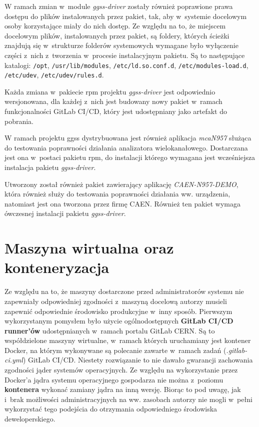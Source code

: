 W ramach zmian w~module \textit{ggss-driver} zostały również poprawione prawa dostępu do plików instalowanych przez pakiet, tak, aby w~systemie docelowym osoby korzystające miały do nich dostęp. 
Ze względu na to, że miejscem docelowym plików, instalowanych przez pakiet, są foldery, których ścieżki znajdują się w~strukturze folderów systemowych wymagane było wyłączenie części z~nich z~tworzenia w~procesie instalacyjnym pakietu. Są to następujące katalogi: \lstinline{/opt}, \lstinline{/usr/lib/modules}, \lstinline{/etc/ld.so.conf.d}, \lstinline{/etc/modules-load.d}, \lstinline{/etc/udev}, \lstinline{/etc/udev/rules.d}.

Każda zmiana w~pakiecie \gls*{rpm} projektu \textit{ggss-driver} jest odpowiednio wersjonowana, dla każdej z~nich jest budowany nowy pakiet w~ramach funkcjonalności GitLab CI/CD, który jest udostępniany jako artefakt do pobrania.

W ramach projektu \gls*{ggss} dystrybuowana jest również aplikacja \textit{mcaN957} służąca do testowania poprawności działania analizatora wielokanałowego. Dostarczana jest ona w~postaci pakietu \gls*{rpm}, do instalacji którego wymagana jest wcześniejsza instalacja pakietu \textit{ggss-driver}.

Utworzony został również pakiet zawierający aplikację \textit{CAEN-N957-DEMO}, która również służy do testowania poprawności działania ww. urządzenia, natomiast jest ona tworzona przez firmę CAEN. Również ten pakiet wymaga ówczesnej instalacji pakietu \textit{ggss-driver}.


\newpage
\section{Maszyna wirtualna oraz konteneryzacja}
\label{sec:wirtDocker}

Ze względu na to, że maszyny dostarczone przed administratorów systemu nie zapewniały odpowiedniej zgodności z~maszyną docelową autorzy musieli zapewnić odpowiednie środowisko produkcyjne w~inny sposób. Pierwszym wykorzystanym pomysłem było użycie ogólnodostępnych \textbf{GitLab CI/CD runner'ów} udostępnianych w~ramach portalu GitLab CERN. Są to współdzielone maszyny wirtualne, w~ramach których uruchamiany jest kontener Docker, na którym wykonywane są polecanie zawarte w~ramach zadań (\textit{.gitlab-ci.yml}) GitLab CI/CD. Niestety rozwiązanie to nie dawało gwarancji zachowania zgodności jąder systemów operacyjnych. Ze względu na wykorzystanie przez Docker'a jądra systemu operacyjnego gospodarza nie można z~poziomu \textbf{kontenera} wykonać zamiany jądra na inną wersję. Biorąc to pod uwagę, jak i~brak możliwości administracyjnych na ww. zasobach autorzy nie mogli w~pełni wykorzystać tego podejścia do otrzymania odpowiedniego środowiska deweloperskiego.

